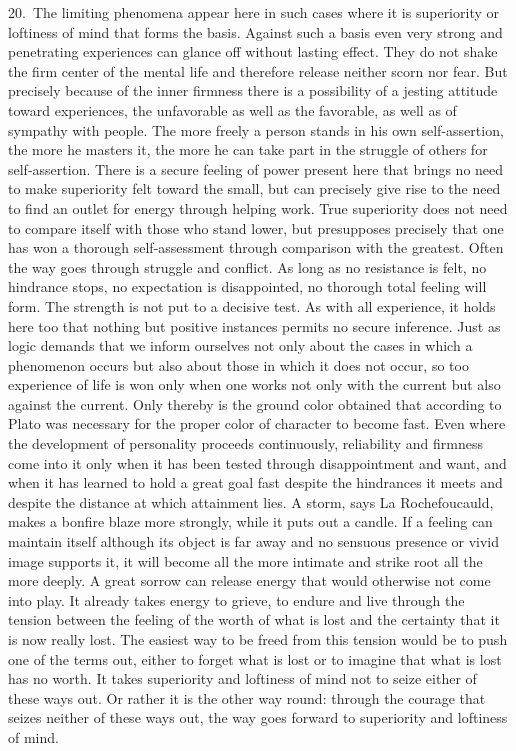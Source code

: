 \documentclass[12pt]{book}
\newcommand{\opage}[1]{\marginnote{\footnotesize\textit{[#1]}}}
\begin{document}
20.~The limiting phenomena appear here in such cases where it is superiority or
loftiness of mind that forms the basis. \opage{78}Against such a basis even very strong
and penetrating experiences can glance off without lasting effect. They do not shake
the firm center of the mental life and therefore release neither scorn nor fear. But
precisely because of the inner firmness there is a possibility of a jesting attitude
toward experiences, the unfavorable as well as the favorable, as well as of sympathy
with people. The more freely a person stands in his own self-assertion, the more he
masters it, the more he can take part in the struggle of others for self-assertion.
There is a secure feeling of power present here that brings no need to make
superiority felt toward the small, but can precisely give rise to the need to find an
outlet for energy through helping work. True superiority does not need to compare
itself with those who stand lower, but presupposes precisely that one has won a
thorough self-assessment through comparison with the greatest. Often the way goes
through struggle and conflict. As long as no resistance is felt, no hindrance stops,
no expectation is disappointed, no thorough total feeling will form. The strength is
not put to a decisive test. As with all experience, it holds here too that nothing
but positive instances permits no secure inference. Just as logic demands that we
inform ourselves not only about the cases in which a phenomenon occurs but also about
those in which it does not occur, so too experience of life is won only when one works
not only with the current but also against the current. Only thereby is the ground
color obtained that according to Plato was necessary for the proper color of character
to become fast. Even where the development of personality proceeds continuously,
reliability and firmness come into it only when it has been tested through
disappointment and want, and when it has learned to hold a great goal fast despite the
hindrances it meets and despite the distance at which attainment lies. A storm, says
La Rochefoucauld, makes a bonfire blaze more strongly, while it puts out a candle. If a
feeling can maintain itself although its object is far away and no sensuous presence
or vivid image supports it, it will become all the more intimate and strike root all
the more deeply. A great sorrow can release energy that would otherwise not come into
play. \opage{79}It already takes energy to grieve, to endure and live through the
tension between the feeling of the worth of what is lost and the certainty that it is
now really lost. The easiest way to be freed from this tension would be to push one of
the terms out, either to forget what is lost or to imagine that what is lost has no
worth. It takes superiority and loftiness of mind not to seize either of these ways
out. Or rather it is the other way round: through the courage that seizes neither of
these ways out, the way goes forward to superiority and loftiness of mind.
\end{document}
